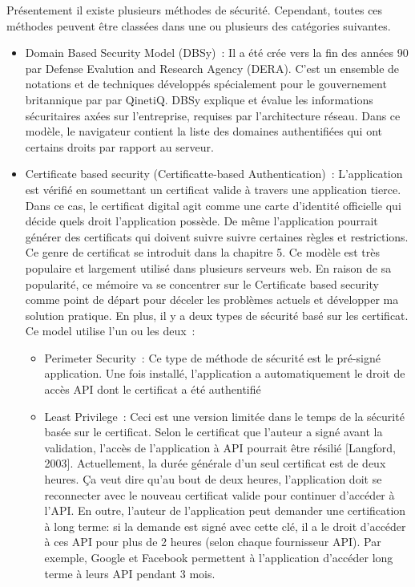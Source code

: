  Présentement il existe plusieurs méthodes de sécurité. Cependant, toutes ces méthodes peuvent être classées dans une ou plusieurs des catégories suivantes.
 \begin{itemize}
 \item Domain Based Security Model (DBSy) : Il a été crée vers la fin des années 90 par Defense Evalution and Research Agency (DERA). C'est un ensemble de notations et de techniques développés spécialement pour le gouvernement britannique par par QinetiQ. DBSy explique et évalue les informations sécuritaires axées sur l'entreprise, requises par l'architecture réseau. Dans ce modèle, le navigateur contient la liste des domaines authentifiées qui ont certains droits par rapport au serveur. 
 \item Certificate based security (Certificatte-based Authentication) : L'application est vérifié en soumettant un certificat valide à travers une application tierce. Dans ce cas, le certificat digital agit comme une carte d'identité officielle qui décide quels droit l'application possède. De même l'application pourrait générer des certificats qui doivent suivre suivre certaines règles et restrictions. Ce genre de certificat se introduit dans la chapitre 5. Ce modèle est très populaire et largement utilisé dans plusieurs serveurs web. En raison de sa popularité, ce mémoire va se  concentrer sur le Certificate based security  comme point de départ pour déceler les problèmes actuels et développer ma solution pratique. En plus, il y a deux types de sécurité basé sur les certificat. Ce model utilise l'un ou les deux :
 \begin{itemize}
 \item Perimeter Security : Ce type de méthode de sécurité est le pré-signé application. Une fois installé, l'application a automatiquement le droit de accès API dont le certificat a été authentifié
 \item Least Privilege : Ceci est une version limitée dans le temps de  la sécurité basée sur le certificat. Selon le certificat que l'auteur  a signé avant la validation, l’accès de l'application à API pourrait être résilié [Langford, 2003]. Actuellement, la durée générale d'un seul certificat est de deux heures. Ça veut dire qu'au bout de deux heures, l'application doit se reconnecter avec le nouveau certificat valide pour continuer d’accéder à l'API. En outre, l'auteur de l'application peut demander une certification à long terme: si la demande est signé avec cette clé, il a le droit d'accéder à ces API pour plus de 2 heures (selon chaque fournisseur API). Par exemple, Google et Facebook permettent à l'application d'accéder long terme à leurs API pendant 3 mois.

\end{itemize}
\end{itemize}
